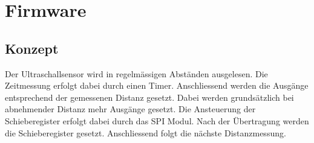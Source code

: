 



\section{Firmware}

\subsection{Konzept}
Der Ultraschallsensor wird in regelmässigen Abständen ausgelesen. Die 
Zeitmessung erfolgt dabei durch einen Timer. Anschliessend werden die 
Ausgänge entsprechend der gemessenen Distanz gesetzt. Dabei werden 
grundsätzlich bei abnehmender Distanz mehr Ausgänge gesetzt. Die 
Ansteuerung der Schieberegister erfolgt dabei durch das SPI Modul. Nach der 
Übertragung werden die Schieberegister gesetzt. Anschliessend folgt die 
nächste Distanzmessung. 
